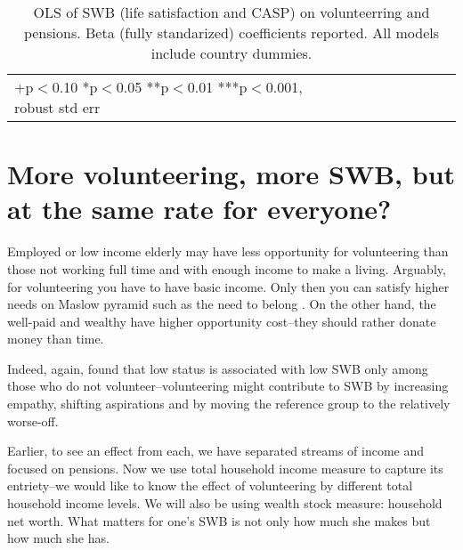 \documentclass[10pt, letterpaper]{article}
\begin{document}
\begin{spacing}{1.4}
\begin{spacing}{.9}
\begin{table}[H]\centering \caption{OLS of SWB (life satisfaction and CASP) on
    volunteerring and pensions. Beta (fully standarized) coefficients reported. All models
    include country dummies.}  \begin{scriptsize} \begin{tabular}{p{1.8in}p{.5in}p{.5in}|p{.5in}p{.5in}p{.5in}p{.5in}p{.5in}p{.5in}p{.5in}p{.4in}p{.5in}p{.4in}}\hline 
      \hline\multicolumn{5}{l}{+p$<$0.10 *p$<$0.05 **p$<$0.01 ***p$<$0.001,
        robust std err} \end{tabular}\label{regCw6} \end{scriptsize}\end{table}
\end{spacing}



\section*{More volunteering, more SWB, but at the same rate for everyone?}

 Employed or low income elderly may have less opportunity for
 volunteering than those not working full time and with enough income to make a
 living. %
%
Arguably, for volunteering you have to have basic income. Only then you can
satisfy  higher needs on Maslow pyramid  such as the need to belong
\citep{maslow87}. On the other hand, the well-paid and wealthy have higher
opportunity cost--they should rather donate money than time.

Indeed, again, \citet{borgonovi2008doing} found that low status is associated
with low SWB only among those who do not volunteer--volunteering
might contribute to SWB by increasing empathy, shifting aspirations and by
moving the reference group to the relatively worse-off.

Earlier,  to see an effect from each, we have separated streams of income and focused on pensions. 
Now we use total household income measure to capture its entriety--we would
like to know the effect of volunteering by different total household income
levels. We will also be using wealth stock measure: household net worth.
%
What matters for one's SWB is not only how much she makes but how much she has.


\end{spacing}
\end{document}
